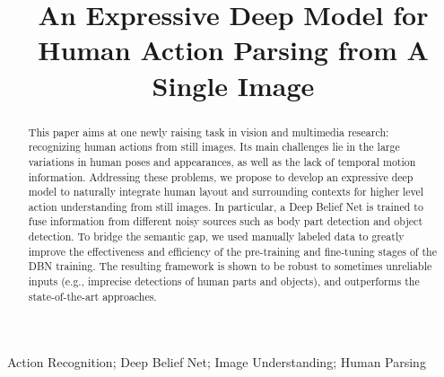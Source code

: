 \documentclass{article}
\begin{document}
\sloppy

\def\x{{\mathbf x}}
\def\L{{\cal L}}

\title{An Expressive Deep Model for Human Action Parsing from A Single Image}
%
\address{$^1$Sun Yat-Sen University, Guangzhou, China. \\ $^2$Huazhong University of Science and Techonology, Wuhan, China. \\ $^3$SYSU-CMU Shunde International Joint Research Institute, Shunde, China. \\ \{ alfredtofu, dragonwxl123 \}@gmail.com, linliang@ieee.org, ruihuang@hust.edu.cn }

\maketitle

%
\begin{abstract}
This paper aims at one newly raising task in vision and multimedia research: recognizing human actions from still images.  Its main challenges lie in the large variations in human poses and appearances, as well as the lack of temporal motion information.  Addressing these problems, we propose to develop an expressive deep model to naturally integrate human layout and surrounding contexts for higher level action understanding from still images.  In particular, a Deep Belief Net is trained to fuse information from different noisy sources such as body part detection and object detection.  To bridge the semantic gap, we used manually labeled data to greatly improve the effectiveness and efficiency of the pre-training and fine-tuning stages of the DBN training.  The resulting framework is shown to be robust to sometimes unreliable inputs (e.g., imprecise detections of human parts and objects), and outperforms the state-of-the-art approaches.

\end{abstract}
%
\begin{keywords}
Action Recognition; Deep Belief Net; Image Understanding; Human Parsing
\end{keywords}
%
\end{document}
